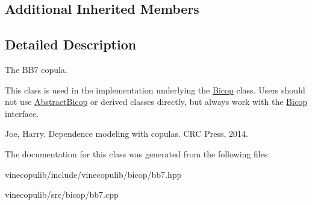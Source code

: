 \subsection*{Additional Inherited Members}


\subsection{Detailed Description}
The B\+B7 copula. 

This class is used in the implementation underlying the \hyperlink{classvinecopulib_1_1_bicop}{Bicop} class. Users should not use \hyperlink{classvinecopulib_1_1_abstract_bicop}{Abstract\+Bicop} or derived classes directly, but always work with the \hyperlink{classvinecopulib_1_1_bicop}{Bicop} interface.

Joe, Harry. Dependence modeling with copulas. C\+R\+C Press, 2014. 

The documentation for this class was generated from the following files\+:\begin{DoxyCompactItemize}
\item 
vinecopulib/include/vinecopulib/bicop/bb7.\+hpp\item 
vinecopulib/src/bicop/bb7.\+cpp\end{DoxyCompactItemize}
